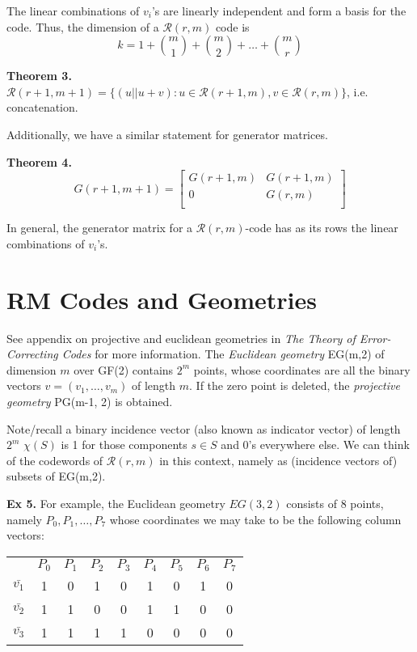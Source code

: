 \documentclass[12pt]{article}
\begin{document}
The linear combinations of $v_i$'s are linearly independent and form a basis for the code. Thus, the dimension of a $\mathscr{R}(r,m)$ code is 
$$k = 1 + {m \choose 1} + {m \choose 2} + \ldots + {m \choose r}$$

\textbf{Theorem 3.} $\mathscr{R}(r+1, m+1) = \{(u||u+v): u \in \mathscr{R}(r+1, m), v\in \mathscr{R}(r,m)\}$, i.e. concatenation. 
\bigskip

Additionally, we have a similar statement for generator matrices.
\bigskip

\textbf{Theorem 4.}
$$G(r+1, m+1) = 
\begin{bmatrix}
G(r+1, m) & G(r+1, m) \\
0 & G(r,m)\\
\end{bmatrix}
$$

In general, the generator matrix for a $\mathscr{R}(r,m)$-code has as its rows the linear combinations of $v_i$'s.
\section{RM Codes and Geometries}
See appendix on projective and euclidean geometries in \textit{The Theory of Error-Correcting Codes} for more information. The \textit{Euclidean geometry} EG(m,2) of dimension $m$ over GF(2) contains $2^m$ points, whose coordinates are all the binary vectors $v = (v_1,\ldots, v_m)$ of length $m$. If the zero point is deleted, the \textit{projective geometry} PG(m-1, 2) is obtained.

Note/recall a binary incidence vector (also known as indicator vector) of length $2^m$ $\chi(S)$ is 1 for those components $s\in S$ and 0's everywhere else. We can think of the codewords of $\mathscr{R}(r,m)$ in this context, namely as (incidence vectors of) subsets of EG(m,2).

\bigskip

\textbf{Ex 5.} For example, the Euclidean geometry $EG(3,2)$ consists of 8 points, namely $P_0, P_1, \ldots , P_7$ whose coordinates we may take to be the following column vectors:

\begin{center}
\begin{tabular}{ c c c c c c c c c }
 & $P_0$ & $P_1$ & $P_2$ &$ P_3$ &$ P_4$ &$ P_5 $& $P_6$ & $P_7$ \\
$\bar{v_1}$ & 1 & 0 & 1 & 0 & 1 & 0 & 1 & 0\\
$\bar{v_2}$ & 1 & 1 & 0 & 0 & 1 & 1 & 0 & 0\\
$\bar{v_3}$ & 1 & 1 & 1 & 1 & 0 & 0 & 0 & 0\\   
\end{tabular}
\end{center}
\end{document}
